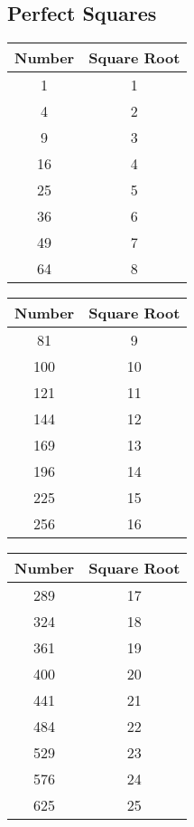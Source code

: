 \documentclass{hw}
\begin{document}
\subsection*{\normalsize Perfect Squares}
\begin{center}
\begin{minipage}{0.3\textwidth}
\centering
\begin{tabular}{|c|c|}
\hline
Number & Square Root \\
\hline
1 & 1 \\
4 & 2 \\
9 & 3 \\
16 & 4 \\
25 & 5 \\
36 & 6 \\
49 & 7 \\
64 & 8 \\
\hline
\end{tabular}
\end{minipage}
\begin{minipage}{0.3\textwidth}
\centering
\begin{tabular}{|c|c|}
\hline
Number & Square Root \\
\hline
81 & 9 \\
100 & 10 \\
121 & 11 \\
144 & 12 \\
169 & 13 \\
196 & 14 \\
225 & 15 \\
256 & 16 \\
\hline
\end{tabular}
\end{minipage}
\begin{minipage}{0.3\textwidth}
\centering
\begin{tabular}{|c|c|}
\hline
Number & Square Root \\
\hline
289 & 17 \\
324 & 18 \\
361 & 19 \\
400 & 20 \\
441 & 21 \\
484 & 22 \\
529 & 23 \\
576 & 24 \\
625 & 25 \\
\hline
\end{tabular}
\end{minipage}
\end{center}
\end{document}
